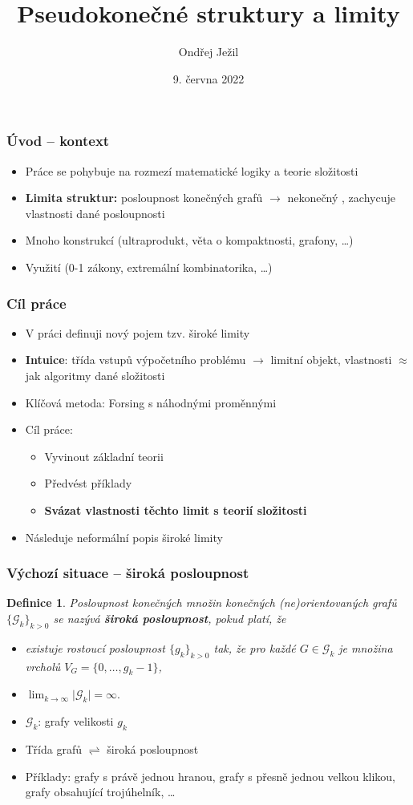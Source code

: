 \documentclass{beamer}
\title{Pseudokonečné struktury a limity}
\author{Ondřej Ježil}
\date{9. června 2022}
\newcommand{\G}{\mathcal{G}}
\newcommand{\0}{\textbf{0}}
\newcommand{\1}{\textbf{1}}
\newcommand{\abs}[1]{\lvert #1 \rvert}
\newtheorem{defi}{Definice}
\begin{document}
\frame{\titlepage}
\begin{frame}
\frametitle{Úvod -- kontext}
\begin{itemize}[<+->]
\item Práce se pohybuje na rozmezí matematické logiky a teorie složitosti
\item \textbf{Limita struktur:}
posloupnost konečných grafů $\to$ nekonečný , zachycuje vlastnosti dané posloupnosti
\item Mnoho konstrukcí (ultraprodukt, věta o kompaktnosti, grafony, \ldots)
\item Využití (0-1 zákony, extremální kombinatorika, \ldots)
\end{itemize}
\end{frame}

\begin{frame}
\frametitle{Cíl práce}
\begin{itemize}[<+->]
\item V práci definuji nový pojem tzv. široké limity
\item \textbf{Intuice}: třída vstupů výpočetního problému $\to$ limitní objekt, vlastnosti $\approx$ jak algoritmy dané složitosti 
\item Klíčová metoda: Forsing s náhodnými proměnnými
\item Cíl práce:
\begin{itemize}
\item Vyvinout základní teorii
\item Předvést příklady
\item \textbf{Svázat vlastnosti těchto limit s teorií složitosti}
\end{itemize}
\item Následuje neformální popis široké limity
\end{itemize}
\end{frame}

\begin{frame}
\frametitle{Výchozí situace -- široká posloupnost}
\begin{defi}
Posloupnost konečných množin konečných (ne)orientovaných grafů $\{\G_k\}_{k>0}$ se nazývá \textbf{široká posloupnost}, pokud platí, že
\begin{itemize}
\item existuje rostoucí posloupnost $\{g_k\}_{k>0}$ tak, že pro každé $G\in\G_k$ je množina vrcholů $V_{G}=\{0,\dots,g_k-1\}$,
\item $\lim_{k\to\infty}\abs{\G_k}=\infty.$
\end{itemize}
\end{defi}
\pause
\begin{itemize}
\item $\G_k$: grafy velikosti $g_k$\pause
\item Třída grafů $\rightleftharpoons$ široká posloupnost\pause 
\item Příklady: grafy s právě jednou hranou, grafy s přesně jednou velkou klikou, grafy obsahující trojúhelník, \ldots
\end{itemize}
\end{frame}
\end{document}
